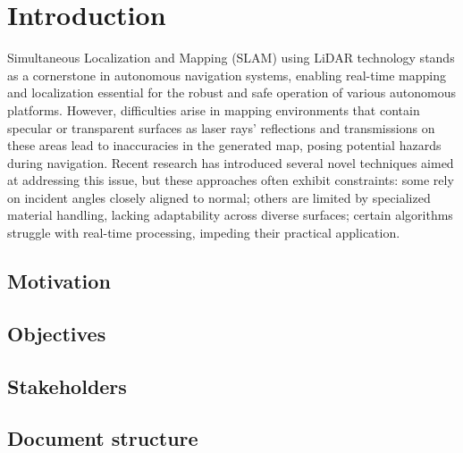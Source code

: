 \chapter{Introduction}
\label{cha:Introduction}

Simultaneous Localization and Mapping (SLAM) using LiDAR technology stands as a cornerstone in autonomous navigation systems, enabling real-time mapping and localization essential for the robust and safe operation of various autonomous platforms. However, difficulties arise in mapping environments that contain specular or transparent surfaces as laser rays' reflections and transmissions on these areas lead to inaccuracies in the generated map, posing potential hazards during navigation. Recent research has introduced several novel techniques aimed at addressing this issue, but these approaches often exhibit constraints: some rely on incident angles closely aligned to normal; others are limited by specialized material handling, lacking adaptability across diverse surfaces; certain algorithms struggle with real-time processing, impeding their practical application.

\section{Motivation}

\section{Objectives}

\section{Stakeholders}

\section{Document structure}